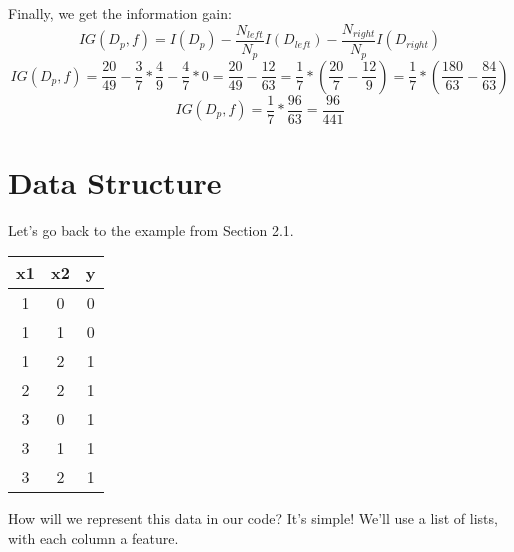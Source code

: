 \documentclass{article}
\begin{document}
Finally, we get the information gain:
\[IG(D_p, f) = I(D_p) - \frac{N_{left}}{N_p}I(D_{left}) - \frac{N_{right}}{N_p}I(D_{right}) \]
\[IG(D_p, f) = \frac{20}{49} - \frac{3}{7}*\frac{4}{9} - \frac{4}{7}*0 = \frac{20}{49} - \frac{12}{63} = \frac{1}{7}*\left(\frac{20}{7} - \frac{12}{9} \right) = \frac{1}{7}*\left(\frac{180}{63} - \frac{84}{63}\right)\]
\[IG(D_p, f) = \frac{1}{7}*\frac{96}{63} = \frac{96}{441}\]


\section{Data Structure}

Let's go back to the example from Section 2.1. 
\begin{center}
\begin{tabular}{ |c|c|c| } 
 \hline
 x1 & x2 & y \\
 \hline
 1 & 0 & 0 \\ 
 1 & 1 & 0 \\ 
 1 & 2 & 1 \\ 
 2 & 2 & 1 \\ 
 3 & 0 & 1 \\
 3 & 1 & 1 \\
 3 & 2 & 1 \\

 \hline
\end{tabular}
\end{center}

How will we represent this data in our code?
It's simple! We'll use a list of lists, with each column a feature.
\end{document}
